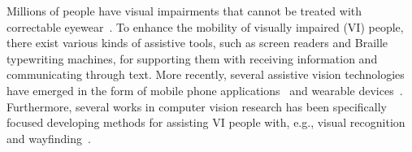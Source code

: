 Millions of people have visual impairments that cannot be treated with correctable eyewear~\cite{bourne2021trends}. To enhance the mobility of visually impaired (VI) people, there exist various kinds of assistive tools, such as screen readers and Braille typewriting machines, for supporting them with receiving information and communicating through text. 
More recently, several assistive vision technologies have emerged in the form of mobile phone applications~\cite{microsoft2017seeing, clary2018lookout,cloudsight2013taptapsee, envision2018app,bemyeyes2017be, aira2017aira} and wearable devices~\cite{orcam2019myeye, envision2020glasses,caraiman2017soundofvision}. Furthermore, several works in computer vision research has been specifically focused developing methods for assisting VI people with, e.g., visual recognition~\cite{ahmetovic2020recog, jafri2014computer, kacorri2017teachable,gurari2018vizwiz,massiceti2021orbit,kacorri2017people,lee2019hands,lee2019revisiting} and wayfinding~\cite{coughlan2009functional, kacorri2018environmental, loomis2020assisting,szpiro2016finding,tian2013toward,lee2020pedestrian}. 




